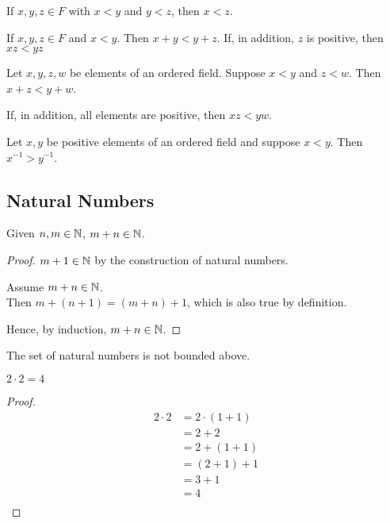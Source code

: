 \begin{prop}
	If $x,y,z \in F$ with $x<y$ and $y<z$, then $x<z$.
\end{prop}

\begin{prop}
	If $x,y,z \in F$ and $x < y$. Then $x+y < y+z$. If, in addition, $z$ is 
	positive, then $xz < yz$
\end{prop}

\begin{prop}
	Let $x,y,z,w$ be elements of an ordered field. Suppose $x<y$ and $z<w$. Then
	$x+z < y+w$.

	If, in addition, all elements are positive, then $xz < yw$.
\end{prop}

\begin{prop}
	Let $x,y$ be positive elements of an ordered field and suppose $x<y$. Then
	$x^{-1} > y^{-1}$.
\end{prop}


\subsection{Natural Numbers}

\begin{prop}
	Given $n,m \in \mathbb{N}$, $m+n \in \mathbb{N}$.

	\begin{proof}
		$m+1 \in \mathbb{N}$ by the construction of natural numbers.

		Assume $m+n \in \mathbb{N}$. \\
		Then $m+(n+1) = (m+n) + 1$, which is also true by definition.

		Hence, by induction, $m+n \in \mathbb{N}$.
	\end{proof} 
\end{prop}

\begin{prop}
	The set of natural numbers is not bounded above.
\end{prop}

\begin{prop}
	$2 \cdot 2 = 4$

	\begin{proof}
	\begin{align*}
		2 \cdot 2 &= 2 \cdot (1+1) \\
				  &= 2 + 2 \\
				  &= 2 + (1+1) \\
				  &= (2+1) + 1	\\
				  &= 3+1 \\
				  &=4 \\
	\end{align*}
	\end{proof}
\end{prop}

